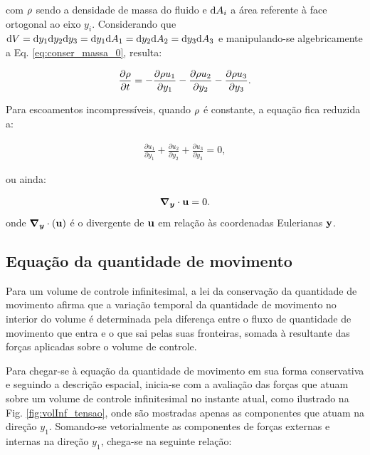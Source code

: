 \documentclass[tese_patricia]{subfiles}%
\begin{document}
\noindent com $\rho$ sendo a densidade de massa do fluido e $\mathrm{d} A_{i}$ a área referente à face ortogonal ao eixo $y_i$. Considerando que $\mathrm{d} V = \mathrm{d} y_1 \mathrm{d} y_2 \mathrm{d} y_3 = \mathrm{d} y_1 \mathrm{d} A_1 = \mathrm{d} y_2 \mathrm{d} A_2 = \mathrm{d} y_3 \mathrm{d} A_3 $  e manipulando-se algebricamente a Eq. \ref{eq:conser_massa_0}, resulta:

\begin{align}
	\frac{\partial \rho}{\partial t} = - \frac{\partial \rho u_{1}}{\partial y_1} - \frac{\partial \rho u_{2}}{\partial y_2}- \frac{\partial \rho u_{3}}{\partial y_3}.
\end{align}

Para escoamentos incompressíveis, quando $\rho$ é constante, a equação fica reduzida a:

\begin{align}
	 \frac{\partial u_{1}}{\partial y_1} + \frac{\partial u_{2}}{\partial y_2} + \frac{\partial u_{3}}{\partial y_3} = 0, 
\end{align} 

\noindent ou ainda:

\begin{align}
	\boldsymbol{\nabla_y} \cdot \mathbf{u} = 0.
	\label{eq:conser_massa_incom} 
\end{align} 
\noindent onde $\boldsymbol{\nabla_y} \cdot (\mathbf{u})$ é o divergente de $\mathbf{u}$ em relação às coordenadas Eulerianas $\mathbf{y}$.

\subsection{Equação da quantidade de movimento}


Para um volume de controle infinitesimal, a lei da conservação da quantidade de movimento afirma que a variação temporal da quantidade de movimento no interior do volume é determinada pela diferença entre o fluxo de quantidade de movimento que entra e o que sai pelas suas fronteiras, somada à resultante das forças aplicadas sobre o volume de controle.

Para chegar-se à equação da quantidade de movimento em sua forma conservativa e seguindo a descrição espacial, inicia-se com a avaliação das forças que atuam sobre um volume de controle infinitesimal no instante atual, como ilustrado na Fig. \ref{fig:volInf_tensao}, onde são mostradas apenas as componentes que atuam na direção $y_1$. Somando-se vetorialmente as componentes de forças externas e internas na direção $y_1$, chega-se na seguinte relação:
\end{document}
